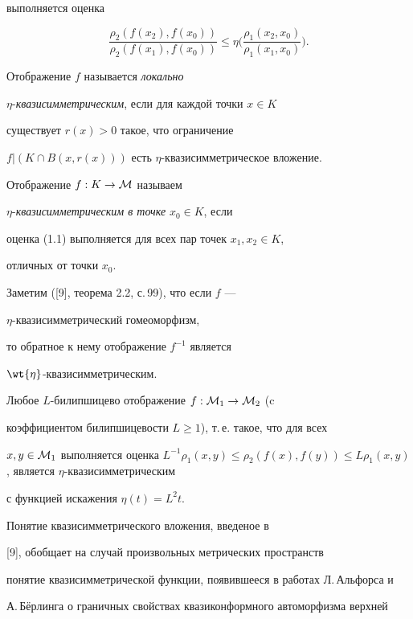 выполняется оценка


\begin{equation}


\frac{\rho_2(f(x_2), f(x_0))}{\rho_2(f(x_1), f(x_0))} \leq 


\eta \bigg( \frac{\rho_1(x_2, x_0)}{\rho_1(x_1, x_0)} \bigg). 


\end{equation}


Отображение $f$ называется {\it локально} 


$\eta$-{\it квазисимметрическим}, если для каждой точки $x\in K$ 


существует $r(x) > 0$ такое, что ограничение 


$f|(K\cap B(x, r(x)))$ есть $\eta$-{}квазисимметрическое вложение. 


Отображение $f: K \to {\cal M}$ называем 


$\eta$-{\it квазисимметрическим в точке} $x_0 \in K$, если 


оценка (1.1) выполняется для всех пар точек $x_1, x_2 \in K$, 


отличных от точки $x_0$.


Заметим ([9], теорема 2.2, с.\,99), что если $f$ ---


$\eta$-{}квазисимметрический гомеоморфизм, 


то обратное к нему отображение $f^{-1}$ является


$\wt{\eta}$-{}квазисимметрическим. 


Любое $L$-билипшицево отображение $f: {\cal M}_1 \to {\cal M}_2$ (c 


коэффициентом билипшицевости $L\geq 1$), т.\,е. такое, что для всех 


$x, y \in {\cal M}_1$ выполняется оценка $L^{-1}\rho_1(x,y) \leq 


\rho_2(f(x), f(y)) \leq L\rho_1(x,y)$, является $\eta$-квазисимметрическим 


с функцией искажения $\eta(t)=L^2t$.





Понятие квазисимметрического вложения, введеное в 


[9], обобщает на случай произвольных метрических пространств 


понятие квазисимметрической функции, появившееся в работах Л.\,Альфорса и 


А.\,Б\"ерлинга о граничных свойствах квазиконформного автоморфизма верхней 


